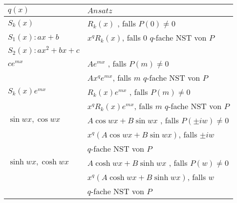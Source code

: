 	
	
	\begin{tabular}{l|l}
		$q(x)$ & $Ansatz$ \\ \hline \hline
		
		$ S_k(x) $ & $R_k(x)$ , falls $P(0) \neq 0$\\
		\small{$S_1(x): ax + b$} &  $x^q R_k(x)$, falls $0$ $q$-fache NST von $P$ \\ 
		\small{$S_2(x): ax^2 + bx + c$} & \\ \hline

		$ c e^{mx} $  & $A e^{mx}$ , falls $P(m) \neq 0$\\ 
		&  $A x^q e^{mx}$, falls $m$ $q$-fache NST von $P$ \\ \hline

		$ S_k(x) e^{mx} $  & $R_k(x) e^{mx}$ , falls $P(m) \neq 0$\\
		&  $x^q R_k(x) e^{mx}$, falls $m$ $q$-fache NST von $P$ \\ \hline
		$ \sin wx, \cos wx $  & $A \cos wx + B \sin wx$ , falls $P(\pm iw) \neq 0$\\
		&  $x^q (A \cos wx + B \sin wx)$, falls $\pm iw$ \\
		& $q$-fache NST von $P$ \\ \hline
		$ \sinh wx, \cosh wx $  & $A \cosh wx + B \sinh wx$ , falls $P(w) \neq 0$\\
		&  $x^q (A \cosh wx + B \sinh wx)$, falls $w$ \\
		& $q$-fache NST von $P$ \\
	\end{tabular}
